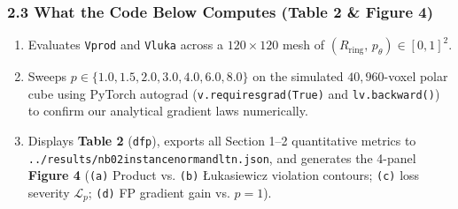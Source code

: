 \documentclass[10pt,a4paper]{article}
\renewcommand{\_}{\origunderscore\allowbreak}
\begin{document}
\subsubsection*{2.3 What the Code Below Computes (Table 2 \& Figure 4)}
\begin{enumerate}
\item Evaluates \texttt{V\_prod} and \texttt{V\_luka} across a $120 \times 120$ mesh of $(R_{\text{ring}},\, p_\theta) \in [0, 1]^2$.
\item Sweeps $p \in \{1.0, 1.5, 2.0, 3.0, 4.0, 6.0, 8.0\}$ on the simulated $40{,}960$-voxel polar cube using PyTorch autograd (\texttt{v.requires\_grad\_(True)} and \texttt{lv.backward()}) to confirm our analytical gradient laws numerically.
\item Displays \textbf{Table 2} (\texttt{df\_p}), exports all Section 1--2 quantitative metrics to \texttt{../\allowbreak{}results/\allowbreak{}nb02\_instancenorm\_and\_ltn.json}, and generates the 4-panel \textbf{Figure 4} (\texttt{(a)} Product vs. \texttt{(b)} \L{}ukasiewicz violation contours; \texttt{(c)} loss severity $\mathcal{L}_p$; \texttt{(d)} FP gradient gain vs. $p = 1$).
\end{enumerate}
\end{document}
